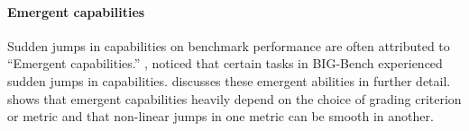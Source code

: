 \paragraph{Emergent capabilities}
Sudden jumps in capabilities on benchmark performance are often attributed to ``Emergent capabilities.'' 
\citet{srivastava2023imitationgamequantifyingextrapolating}, noticed that certain tasks in BIG-Bench experienced sudden jumps in capabilities.
\citet{wei2022emergentabilitieslargelanguage} discusses these emergent abilities in further detail.
\citet{schaeffer2023emergent} shows that emergent capabilities heavily depend on the choice of grading criterion or metric and that non-linear jumps in one metric can be smooth in another. 